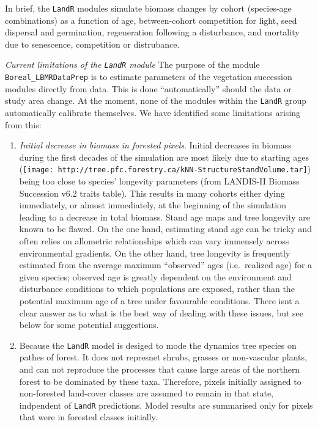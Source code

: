 \documentclass[]{article}
\begin{document}
In brief, the \texttt{LandR} modules simulate biomass changes by cohort
(species-age combinations) as a function of age, between-cohort
competition for light, seed dispersal and germination, regeneration
following a disturbance, and mortality due to senescence, competition or
distrubance.

\emph{Current limitations of the \texttt{LandR} module} The purpose of
the module \texttt{Boreal\_LBMRDataPrep} is to estimate parameters of
the vegetation succession modules directly from data. This is done
``automatically'' should the data or study area change. At the moment,
none of the modules within the \texttt{LandR} group automatically
calibrate themselves. We have identified some limitations arising from
this:

\begin{enumerate}
\def\labelenumi{\arabic{enumi}.}
\item
  \emph{Initial decrease in biomass in forested pixels}. Initial
  decreases in biomass during the first decades of the simulation are
  most likely due to starting ages
  (\texttt{[image: http://tree.pfc.forestry.ca/kNN-StructureStandVolume.tar]})
  being too close to species' longevity parameters (from LANDIS-II
  Biomass Succession v6.2 traits table). This results in many cohorts
  either dying immediately, or almost immediately, at the beginning of
  the simulation leading to a decrease in total biomass. Stand age maps
  and tree longevity are known to be flawed. On the one hand, estimating
  stand age can be tricky and often relies on allometric relationships
  which can vary immensely across environmental gradients. On the other
  hand, tree longevity is frequently estimated from the average maximum
  ``observed'' ages (i.e.~realized age) for a given species; observed
  age is greatly dependent on the environment and disturbance conditions
  to which populations are exposed, rather than the potential maximum
  age of a tree under favourable conditions. There isnt a clear answer
  as to what is the best way of dealing with these issues, but see below
  for some potential suggestions.
\item
  Because the \texttt{LandR} model is desiged to mode the dynamics tree
  species on pathes of forest. It does not represnet shrubs, grasses or
  non-vascular plants, and can not reproduce the processes that cause
  large areas of the northern forest to be dominated by these taxa.
  Therefore, pixels initially assigned to non-forested land-cover
  classes are assumed to remain in that state, indpendent of
  \texttt{LandR} predictions. Model results are summarised only for
  pixels that were in forested classes initially.
\end{enumerate}
\end{document}

